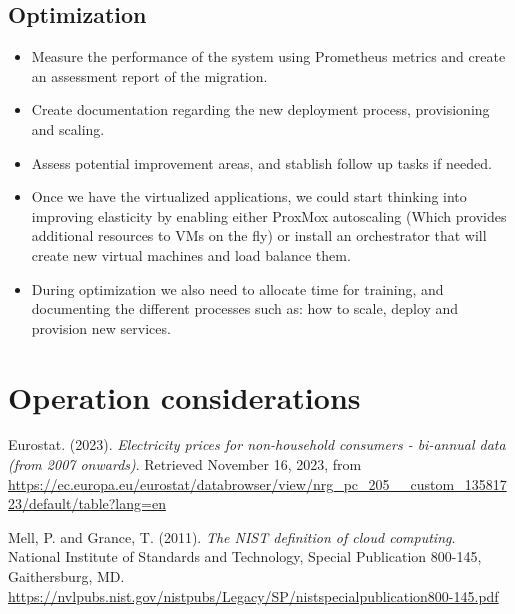\documentclass{llncs}
\begin{document}
\subsection{Optimization}

\begin{itemize}
  \item Measure the performance of the system using Prometheus metrics and create an assessment report of the migration.
        
  \item Create documentation regarding the new deployment process, provisioning and scaling.
        
  \item Assess potential improvement areas, and stablish follow up tasks if needed.
        
  \item Once we have the virtualized applications, we could start thinking into improving elasticity by enabling either ProxMox autoscaling (Which provides additional resources to VMs on the fly) or install an orchestrator that will create new virtual machines and load balance them.
        
  \item During optimization we also need to allocate time for training, and documenting the different processes such as: how to scale, deploy and provision new services.
\end{itemize}

\section{Operation considerations}


\begin{thebibliography}{5}

  Eurostat. (2023). \textit{Electricity prices for non-household consumers - bi-annual data (from 2007 onwards)}. Retrieved November 16, 2023, from \url{https://ec.europa.eu/eurostat/databrowser/view/nrg_pc_205__custom_13581723/default/table?lang=en}
  
  Mell, P. and Grance, T. (2011).
  \emph{The NIST definition of cloud computing}.
  National Institute of Standards and Technology, Special Publication 800-145, Gaithersburg, MD.
  \url{https://nvlpubs.nist.gov/nistpubs/Legacy/SP/nistspecialpublication800-145.pdf} 
  
  \end{thebibliography}
\end{document}
